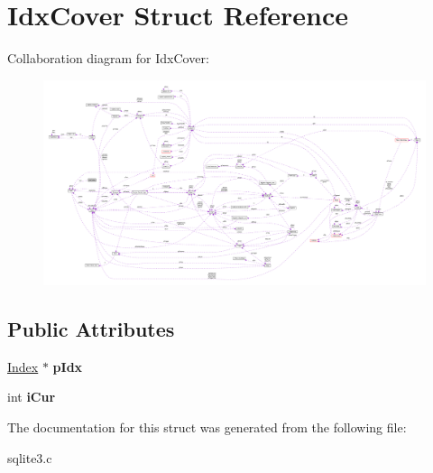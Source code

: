 \hypertarget{structIdxCover}{}\section{Idx\+Cover Struct Reference}
\label{structIdxCover}


Collaboration diagram for Idx\+Cover\+:\nopagebreak
\begin{figure}[H]
\begin{center}
\leavevmode
\includegraphics[width=350pt]{structIdxCover__coll__graph}
\end{center}
\end{figure}
\subsection*{Public Attributes}
\begin{DoxyCompactItemize}
\item 
\hyperlink{structIndex}{Index} $\ast$ {\bfseries p\+Idx}\hypertarget{structIdxCover_a5ccfb55ea6898b63aee5626a6ee5365e}{}\label{structIdxCover_a5ccfb55ea6898b63aee5626a6ee5365e}

\item 
int {\bfseries i\+Cur}\hypertarget{structIdxCover_ab7d59e1b07eecac9aaf9bcd9f7d8edc0}{}\label{structIdxCover_ab7d59e1b07eecac9aaf9bcd9f7d8edc0}

\end{DoxyCompactItemize}


The documentation for this struct was generated from the following file\+:\begin{DoxyCompactItemize}
\item 
sqlite3.\+c\end{DoxyCompactItemize}
